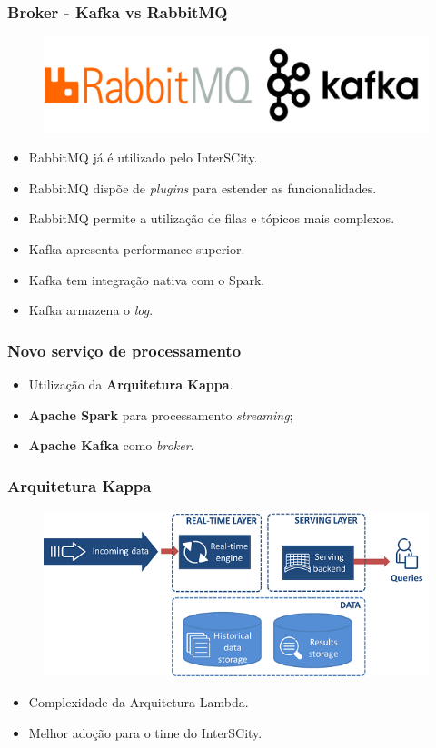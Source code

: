 \documentclass{beamer}
\begin{document}
  \begin{frame}
      \frametitle{Broker - Kafka vs RabbitMQ}
      \begin{figure}
          \includegraphics[scale=0.3]{figures/Brokers.png}
      \end{figure}
      \begin{itemize}
          \item RabbitMQ já é utilizado pelo InterSCity.
          \item RabbitMQ dispõe de \textit{plugins} para estender as funcionalidades.
          \item RabbitMQ permite a utilização de filas e tópicos mais complexos.
          \item Kafka apresenta performance superior.
          \item Kafka tem integração nativa com o Spark.
          \item Kafka armazena o \textit{log}.
      \end{itemize}
  \end{frame}

  \begin{frame}
      \frametitle{Novo serviço de processamento}
      \begin{itemize}
          \item<2-> Utilização da \textbf{Arquitetura Kappa}.
          \item<3-> \textbf{Apache Spark} para processamento \textit{streaming};
          \item<4-> \textbf{Apache Kafka} como \textit{broker}.
      \end{itemize}
  \end{frame}

  \begin{frame}
      \frametitle{Arquitetura Kappa}
      \begin{figure}
          \includegraphics[scale=0.4]{figures/KappaArchitecture.png}
      \end{figure}
      \begin{itemize}
          \item Complexidade da Arquitetura Lambda.
          \item Melhor adoção para o time do InterSCity.
      \end{itemize}
  \end{frame}
\end{document}
